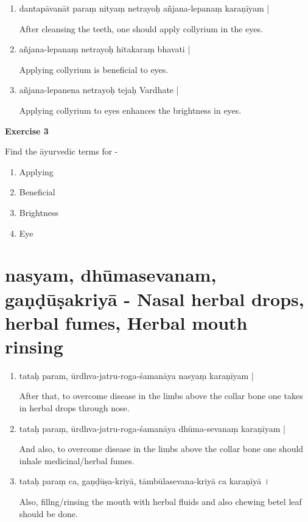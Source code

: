 \begin{enumerate}
\item {}

dantapāvanāt  paraṃ nityaṃ netrayoḥ añjana-lepanaṃ karaṇīyam | 

After cleansing the teeth, one should apply collyrium in the eyes. 

\item {}

añjana-lepanaṃ netrayoḥ hitakaraṃ  bhavati | 

Applying collyrium  is beneficial to eyes. 

\item {}

añjana-lepanena netrayoḥ tejaḥ Vardhate |  

Applying collyrium to eyes enhances the brightness in eyes.
\end{enumerate}

\begin{center}
\textbf{\large Exercise 3}
\end{center}

Find the āyurvedic terms for - 
\begin{enumerate}
\renewcommand{\theenumi}{\alph{enumi}}
\renewcommand{\labelenumi}{\theenumi.}
\item Applying 
\item Beneficial
\item Brightness 
\item Eye
\end{enumerate}

\chapter{nasyam, dhūmasevanam, gaṇḍūṣakriyā - Nasal herbal drops, herbal fumes, Herbal mouth rinsing}

\begin{enumerate}
\item {}

tataḥ param,  ūrdhva-jatru-roga-śamanāya nasyaṃ  karaṇīyam | 

After that, to overcome disease in the limbs above the collar bone one takes in herbal drops through nose.  

\item {}

tataḥ paraṃ,  ūrdhva-jatru-roga-śamanāya  dhūma-sevanaṃ karaṇīyam |

And also, to overcome disease in the limbs above the collar bone one should inhale medicinal/herbal fumes.

\item {}

tataḥ paraṃ ca, gaṇḍūṣa-kriyā, tāmbūlasevana-kriyā ca  karaṇīyā ।

Also, fillng/rinsing the mouth with herbal fluids and also chewing betel leaf should be done.   
\end{enumerate}

